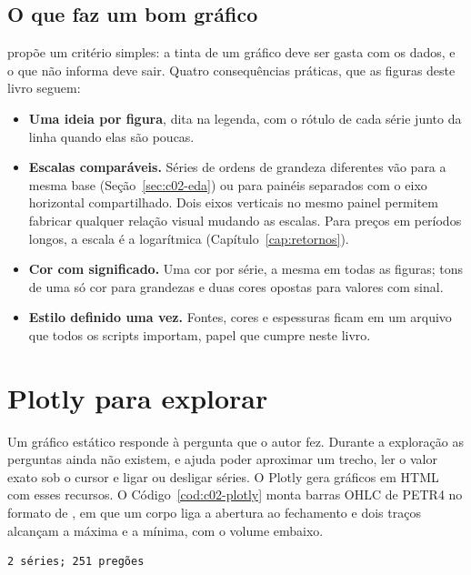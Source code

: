 \subsection{O que faz um bom gráfico}

\citet{tufte2001} propõe um critério simples: a tinta de um gráfico deve ser gasta com os dados, e o que não informa deve sair. Quatro consequências práticas, que as figuras deste livro seguem:

\begin{itemize}
  \item \textbf{Uma ideia por figura}, dita na legenda, com o rótulo de cada série junto da linha quando elas são poucas.
  \item \textbf{Escalas comparáveis.} Séries de ordens de grandeza diferentes vão para a mesma base (Seção~\ref{sec:c02-eda}) ou para painéis separados com o eixo horizontal compartilhado. Dois eixos verticais no mesmo painel permitem fabricar qualquer relação visual mudando as escalas. Para preços em períodos longos, a escala é a logarítmica (Capítulo~\ref{cap:retornos}).
  \item \textbf{Cor com significado.} Uma cor por série, a mesma em todas as figuras; tons de uma só cor para grandezas e duas cores opostas para valores com sinal.
  \item \textbf{Estilo definido uma vez.} Fontes, cores e espessuras ficam em um arquivo que todos os scripts importam, papel que  cumpre neste livro.
\end{itemize}

\section{Plotly para explorar}
\label{sec:c02-plotly}

Um gráfico estático responde à pergunta que o autor fez. Durante a exploração as perguntas ainda não existem, e ajuda poder aproximar um trecho, ler o valor exato sob o cursor e ligar ou desligar séries. O Plotly gera gráficos em HTML com esses recursos. O Código~\ref{cod:c02-plotly} monta barras OHLC de PETR4 no formato de , em que um corpo liga a abertura ao fechamento e dois traços alcançam a máxima e a mínima, com o volume embaixo.


\begin{lstlisting}[style=saida]
2 séries; 251 pregões
\end{lstlisting}

